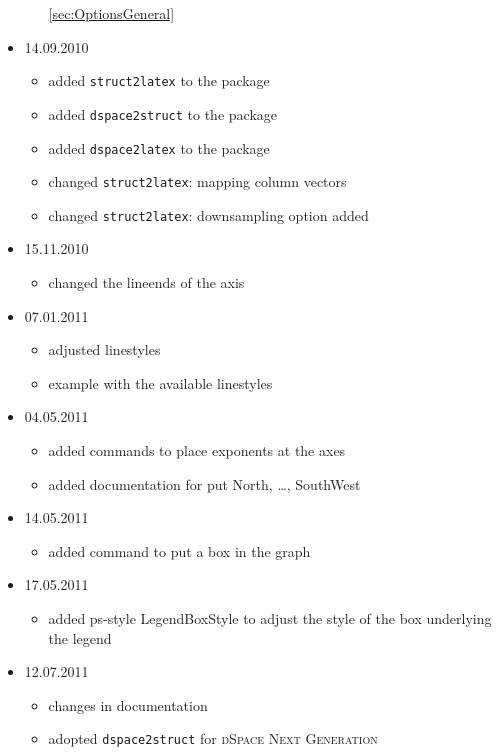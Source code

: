 \begin{itemize}
\begin{itemize}
  	\ref{sec:OptionsGeneral}
  \end{itemize}
  \item 14.09.2010
    \begin{itemize}
      \item added \texttt{struct2latex} to the package
      \item added \texttt{dspace2struct} to the package
      \item added \texttt{dspace2latex} to the package
      \item changed \texttt{struct2latex}: mapping column vectors
      \item changed \texttt{struct2latex}: downsampling option added
    \end{itemize}
   \item 15.11.2010
   \begin{itemize}
     \item changed the lineends of the axis
   \end{itemize}
   \item 07.01.2011
   \begin{itemize}
     \item adjusted linestyles
     \item example with the available linestyles
   \end{itemize}
   \item 04.05.2011
   \begin{itemize}
     \item added commands to place exponents at the axes
     \item added documentation for put North, \ldots, SouthWest
   \end{itemize}
   \item 14.05.2011
   \begin{itemize}
     \item added command to put a box in the graph
   \end{itemize}
   \item 17.05.2011
   \begin{itemize}
     \item added ps-style LegendBoxStyle to adjust the style of the box
     underlying the legend
   \end{itemize}
      \item 12.07.2011
   \begin{itemize}
     \item changes in documentation
     \item adopted \texttt{dspace2struct} for \textsc{dSpace Next Generation}

\end{itemize}
\end{itemize}
